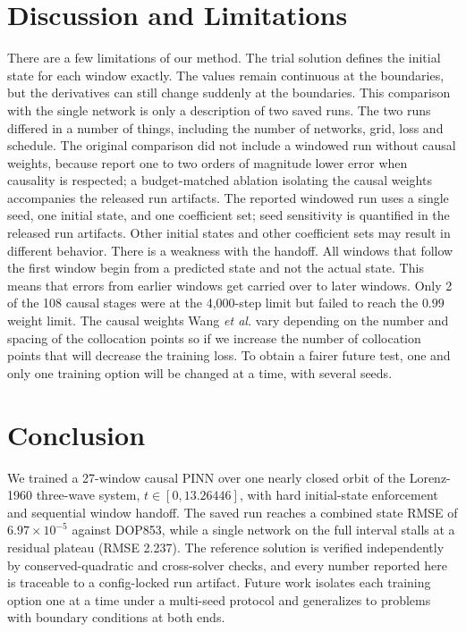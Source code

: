 \documentclass[conference]{IEEEtran}
\begin{document}
\section{Discussion and Limitations}
There are a few limitations of our method. The trial solution \cite{lagaris1998} defines the initial state for each window exactly. The values remain continuous at the boundaries, but the derivatives can still change suddenly at the boundaries. This comparison with the single network is only a description of two saved runs. The two runs differed in a number of things, including the number of networks, grid, loss and schedule. The original comparison did not include a windowed run without causal weights, because \cite{wang2024causal} report one to two orders of magnitude lower error when causality is respected; a budget-matched ablation isolating the causal weights accompanies the released run artifacts. The reported windowed run uses a single seed, one initial state, and one coefficient set; seed sensitivity is quantified in the released run artifacts. Other initial states and other coefficient sets may result in different behavior. There is a weakness with the handoff. All windows that follow the first window begin from a predicted state and not the actual state. This means that errors from earlier windows get carried over to later windows. Only 2 of the 108 causal stages were at the 4,000-step limit but failed to reach the $0.99$ weight limit. The causal weights Wang \emph{et al.} vary depending on the number and spacing of the collocation points so if we increase the number of collocation points that will decrease the training loss. To obtain a fairer future test, one and only one training option will be changed at a time, with several seeds.

\section{Conclusion}



We trained a 27-window causal PINN over one nearly closed orbit of the Lorenz-1960 three-wave system, $t\in[0,13.26446]$, with hard initial-state enforcement and sequential window handoff. The saved run reaches a combined state RMSE of $6.97\times10^{-5}$ against DOP853, while a single network on the full interval stalls at a residual plateau (RMSE 2.237). The reference solution is verified independently by conserved-quadratic and cross-solver checks, and every number reported here is traceable to a config-locked run artifact. Future work isolates each training option one at a time under a multi-seed protocol and generalizes to problems with boundary conditions at both ends.










\end{document}
